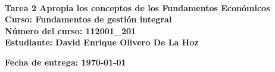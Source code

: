\begin{titlepage}
    \centering
    \fontsize{12pt}{14}\

    \vspace{3cm}
    \normalsize \textbf{\huge Tarea 2 Apropia los conceptos de los Fundamentos Económicos} \\
    \normalsize \textbf{Curso: Fundamentos de gestión integral} \\
    \normalsize \textbf{Número del curso: 112001\_201} \\
    \normalsize \textbf{Estudiante: David Enrique Olivero De La Hoz \cite{economia1}}
    
    \vfil
    \begin{flushright}
        \normalsize \textbf{Fecha de entrega: \today}
    \end{flushright}
    \normalsize \textbf{}
\end{titlepage}